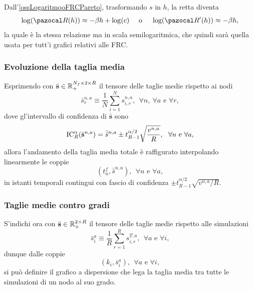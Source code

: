         \begin{oss}
          Dall'\cref{ossLogaritmooFRCPareto}, trasformando \(s\) in \(h\), la retta diventa
          \[
            \log(\pazocal R(h))\approx-\beta h+\log(c)
            \quad\text{ o }\quad
            \log(\pazocal R'(h))\approx-\beta h,
          \]
          la quale è la stessa relazione ma in scala semilogaritmica, che quindi sarà quella usata per tutt'i grafici relativi alle FRC.
        \end{oss}

      \subsubsection{Evoluzione della taglia media}

        Esprimendo con \(\bar{\mathbf s}\in\mathbb R_+^{N_f\times2\times R}\) il tensore delle taglie medie rispetto ai nodi
        \begin{equation*}
          \bar s^{n,a}_r\equiv
          \frac1N\sum_{i=1}^Ns^{n,a}_{i,r}
          ,\ \ \forall n,\ \forall a\text{ e }\forall r,
        \end{equation*}
        dove gl'intervallo di confidenza di \(\bar{\mathbf s}\) sono
        \begin{equation*}
          \operatorname{IC}_R^{\alpha}(\bar{\mathbf s}^{n,a})=
          \bar{\bar s}^{n,a}\pm t^{\alpha/2}_{R-1}\sqrt{\frac{v^{n,a}}R},
          \ \ \forall n\text{ e }\forall a,
        \end{equation*}
        allora l'andamento della taglia media totale è raffigurato interpolando linearmente le coppie
        \begin{equation*}
          \left(t^f_n,\bar{\bar s}^{n,a}\right),
          \ \ \forall n\text{ e }\forall a,
        \end{equation*}
        in istanti temporali contingui con fascio di confidenza \(\pm t^{\alpha/2}_{R-1}\sqrt{v^{n,a}/R}\).
    
      \subsubsection{Taglie medie contro gradi}
      
        S'indichi ora con \(\bar{\mathbf s}\in\mathbb R_+^{2\times R}\) il tensore delle taglie medie rispetto alle simulazioni
        \begin{equation*}
          \bar s^a_i\equiv
          \frac1R\sum_{r=1}^Rs^{T,a}_{i,r}
          ,\ \ \forall a\text{ e }\forall i,
        \end{equation*}
        dunque dalle coppie
        \begin{equation*}
          \left(k_i,\bar s^a_i\right),
          \ \ \forall a\text{ e }\forall i,
        \end{equation*}
        si può definire il grafico a dispersione che lega la taglia media tra tutte le simulazioni di un nodo al suo grado.

